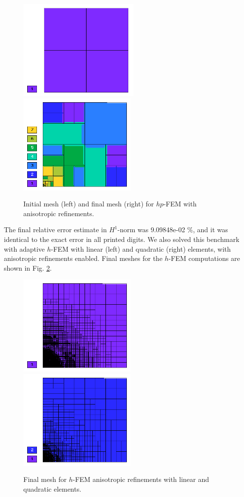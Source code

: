 \begin{figure}[!ht]
\centering
\includegraphics[height=5cm]{nist/nist-8/mesh_hp_aniso_init.png}\ \
\includegraphics[height=5cm]{nist/nist-8/mesh_hp_aniso.png}
\caption{Initial mesh (left) and final mesh (right) for $hp$-FEM with anisotropic refinements.}
\label{fig:nist-8-hp-aniso}
\end{figure}

The final relative error estimate in $H^1$-norm was 9.09848e-02 \%,
and it was identical to the exact error in all printed digits.
We also solved this benchmark with adaptive $h$-FEM
with linear (left) and quadratic (right)
elements, with anisotropic refinements enabled.
Final meshes for the $h$-FEM computations are shown
in Fig. \ref{fig:nist-8-h-aniso}.

\begin{figure}[!ht]
\centering
\includegraphics[height=5cm]{nist/nist-8/mesh_h1_aniso.png}\ \
\includegraphics[height=5cm]{nist/nist-8/mesh_h2_aniso.png}
\caption{Final mesh for $h$-FEM anisotropic refinements with linear and quadratic elements.}
\label{fig:nist-8-h-aniso}
\end{figure}

